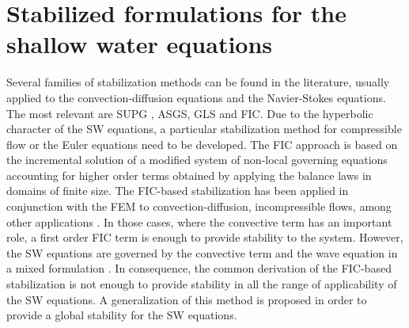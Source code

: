 






\section{Stabilized formulations for the shallow water equations}
\label{sec:fic_fem_stabilization}


Several families of stabilization methods can be found in the literature, usually applied to the convection-diffusion equations and the Navier-Stokes equations. The most relevant are SUPG \cite{brooks1982},
ASGS\cite{codina1998}, GLS \cite{hughes1989} and FIC\cite{onate1996,onate1998}.
Due to the hyperbolic character of the SW equations, a particular stabilization method for compressible flow or the Euler equations need to be developed.
The FIC approach is based on the incremental solution of a modified system of non-local governing equations accounting for higher order terms obtained by applying the balance laws in domains of finite size.
The FIC-based stabilization has been applied in conjunction with the FEM to convection-diffusion, incompressible flows, among other applications \cite{onate1998,onate2001}.
In those cases, where the convective term has an important role, a first order FIC term is enough to provide stability to the system.
However, the SW equations are governed by the convective term and the wave equation in a mixed formulation \cite{codina2008}. In consequence, the common derivation of the FIC-based stabilization is not enough to provide stability in all the range of applicability of the SW equations. 
A generalization of this method is proposed in order to provide a global stability for the SW equations.

